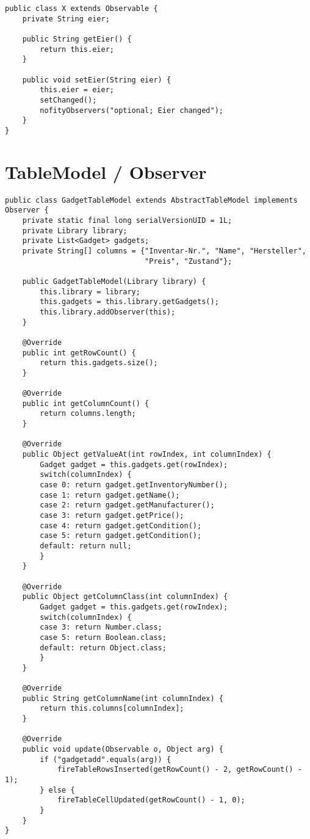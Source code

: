 \documentclass{report}
\begin{document}
\begin{lstlisting}
public class X extends Observable {
	private String eier;

	public String getEier() {
		return this.eier;
	}

	public void setEier(String eier) {
		this.eier = eier;
		setChanged();
		nofityObservers("optional; Eier changed");
	}
}

\end{lstlisting}

\newpage
\section*{TableModel / Observer}
\begin{lstlisting}
public class GadgetTableModel extends AbstractTableModel implements Observer {
	private static final long serialVersionUID = 1L;
	private Library library;
	private List<Gadget> gadgets;
	private String[] columns = {"Inventar-Nr.", "Name", "Hersteller", 
								"Preis", "Zustand"};
	
	public GadgetTableModel(Library library) {
		this.library = library;
		this.gadgets = this.library.getGadgets();
		this.library.addObserver(this);
	}
	
	@Override
	public int getRowCount() {
		return this.gadgets.size();
	}

	@Override
	public int getColumnCount() {
		return columns.length;
	}

	@Override
	public Object getValueAt(int rowIndex, int columnIndex) {
		Gadget gadget = this.gadgets.get(rowIndex);
		switch(columnIndex) {
		case 0: return gadget.getInventoryNumber();
		case 1:	return gadget.getName();
		case 2: return gadget.getManufacturer();
		case 3: return gadget.getPrice();
		case 4: return gadget.getCondition();
		case 5: return gadget.getCondition();
		default: return null;
		}
	}
		
	@Override
	public Object getColumnClass(int columnIndex) {
		Gadget gadget = this.gadgets.get(rowIndex);
		switch(columnIndex) {
		case 3: return Number.class;
		case 5: return Boolean.class;
		default: return Object.class;
		}
	}
	
	@Override
	public String getColumnName(int columnIndex) {
		return this.columns[columnIndex];
	}

	@Override
	public void update(Observable o, Object arg) {
		if ("gadgetadd".equals(arg)) {
			fireTableRowsInserted(getRowCount() - 2, getRowCount() - 1);
		} else {
			fireTableCellUpdated(getRowCount() - 1, 0);
		}
	}
}
\end{lstlisting}
\end{document}
